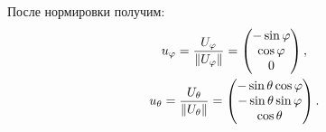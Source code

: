 После нормировки получим:
\begin{gather*}
    u_{\varphi}
    = \frac{U_{\varphi}}{\left \| U_{\varphi} \right \|}
    = \begin{pmatrix}
        - \sin \varphi \\
        \cos \varphi   \\
        0
    \end{pmatrix} , \\
    u_{\theta}
    = \frac{U_\theta}{\left \| U_\theta \right \|}
    = \begin{pmatrix}
        - \sin \theta \cos \varphi \\
        - \sin \theta \sin \varphi \\
        \cos \theta
    \end{pmatrix} .
\end{gather*}

